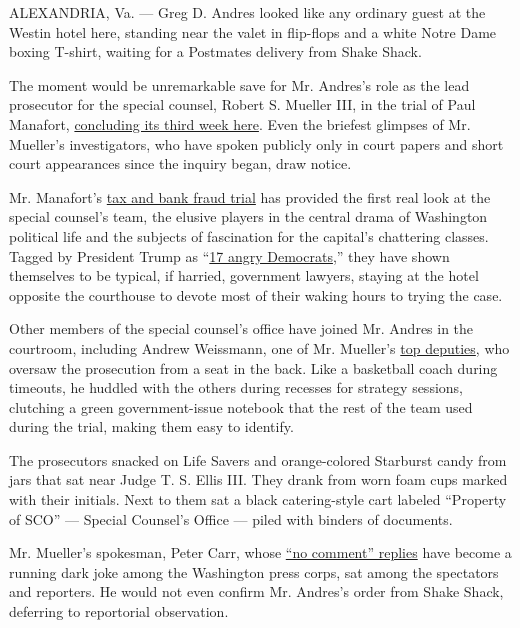ALEXANDRIA, Va. --- Greg D. Andres looked like any ordinary guest at the
Westin hotel here, standing near the valet in flip-flops and a white
Notre Dame boxing T-shirt, waiting for a Postmates delivery from Shake
Shack.

The moment would be unremarkable save for Mr. Andres's role as the lead
prosecutor for the special counsel, Robert S. Mueller III, in the trial
of Paul Manafort,
\href{https://www.nytimes3xbfgragh.onion/2018/08/16/us/politics/paul-manafort-trial-jury-verdict.html}{concluding
its third week here}. Even the briefest glimpses of Mr. Mueller's
investigators, who have spoken publicly only in court papers and short
court appearances since the inquiry began, draw notice.

Mr. Manafort's
\href{https://www.nytimes3xbfgragh.onion/2018/08/08/insider/the-manafort-trial-case.html}{tax
and bank fraud trial} has provided the first real look at the special
counsel's team, the elusive players in the central drama of Washington
political life and the subjects of fascination for the capital's
chattering classes. Tagged by President Trump as
``\href{https://www.nytimes3xbfgragh.onion/2018/05/04/us/politics/fact-check-trump-mueller-democrats.html}{17
angry Democrats},'' they have shown themselves to be typical, if
harried, government lawyers, staying at the hotel opposite the
courthouse to devote most of their waking hours to trying the case.

Other members of the special counsel's office have joined Mr. Andres in
the courtroom, including Andrew Weissmann, one of Mr. Mueller's
\href{https://www.nytimes3xbfgragh.onion/2017/10/31/us/politics/andrew-weissmann-mueller.html}{top
deputies}, who oversaw the prosecution from a seat in the back. Like a
basketball coach during timeouts, he huddled with the others during
recesses for strategy sessions, clutching a green government-issue
notebook that the rest of the team used during the trial, making them
easy to identify.

The prosecutors snacked on Life Savers and orange-colored Starburst
candy from jars that sat near Judge T. S. Ellis III. They drank from
worn foam cups marked with their initials. Next to them sat a black
catering-style cart labeled ``Property of SCO'' --- Special Counsel's
Office --- piled with binders of documents.

Mr. Mueller's spokesman, Peter Carr, whose
\href{https://www.sltrib.com/news/politics/2018/04/14/mr-no-comment-meet-the-utahn-who-speaks-for-the-special-counsels-russia-trump-probe-but-dont-expect-him-to-say-too-much/}{``no
comment'' replies} have become a running dark joke among the Washington
press corps, sat among the spectators and reporters. He would not even
confirm Mr. Andres's order from Shake Shack, deferring to reportorial
observation.

